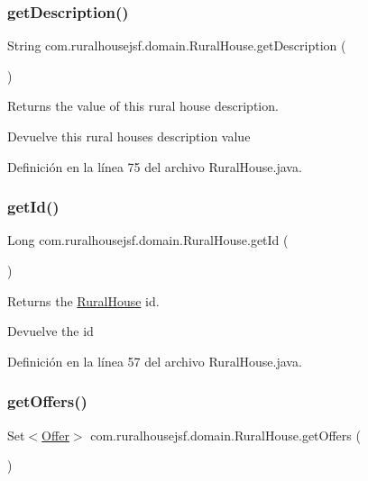 \subsubsection{\texorpdfstring{getDescription()}{getDescription()}}
{\footnotesize\ttfamily String com.\+ruralhousejsf.\+domain.\+Rural\+House.\+get\+Description (\begin{DoxyParamCaption}{ }\end{DoxyParamCaption})}



Returns the value of this rural house description. 

\begin{DoxyReturn}{Devuelve}
this rural houses description value 
\end{DoxyReturn}


Definición en la línea 75 del archivo Rural\+House.\+java.

\mbox{\label{a00188_adae53723eac123b55f8122e89cdfe9c3}} 
\subsubsection{\texorpdfstring{getId()}{getId()}}
{\footnotesize\ttfamily Long com.\+ruralhousejsf.\+domain.\+Rural\+House.\+get\+Id (\begin{DoxyParamCaption}{ }\end{DoxyParamCaption})}



Returns the \mbox{\hyperlink{a00188}{Rural\+House}} id. 

\begin{DoxyReturn}{Devuelve}
the id 
\end{DoxyReturn}


Definición en la línea 57 del archivo Rural\+House.\+java.

\mbox{\label{a00188_a8e5bd3ba4e562e0c1e57e762cdee9447}} 
\subsubsection{\texorpdfstring{getOffers()}{getOffers()}}
{\footnotesize\ttfamily Set$<$\mbox{\hyperlink{a00184}{Offer}}$>$ com.\+ruralhousejsf.\+domain.\+Rural\+House.\+get\+Offers (\begin{DoxyParamCaption}{ }\end{DoxyParamCaption})}



